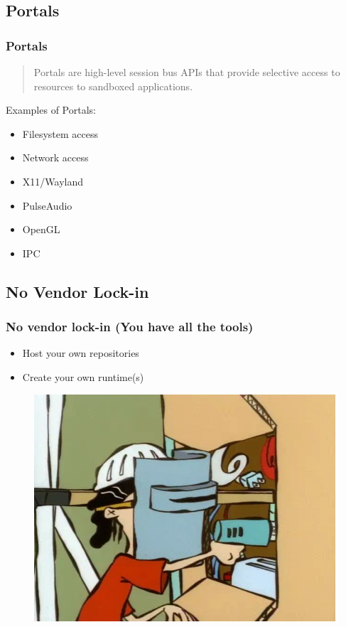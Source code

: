 \documentclass[handout]{beamer}
\begin{document}
\subsection{Portals}
\begin{frame}
	\frametitle{Portals}
	\begin{quotation}
		Portals are high-level session bus APIs that provide selective access to resources to sandboxed applications.
	\end{quotation}
	\medskip
	\begin{Large}Examples of Portals:\end{Large}
		\begin{itemize}
			\item{Filesystem access}
			\item{Network access}
			\item{X11/Wayland}
			\item{PulseAudio}
			\item{OpenGL}
			\item{IPC}
		\end{itemize}
\end{frame}
\subsection{No Vendor Lock-in}
\begin{frame}
	\frametitle{No vendor lock-in (You have all the tools)}
	\begin{itemize}
		\item{Host your own repositories}
		\item{Create your own runtime(s)}
	\end{itemize}
	\begin{figure}[h]\includegraphics[scale=0.25]{tools.jpg}\end{figure}
\end{frame}
\end{document}
